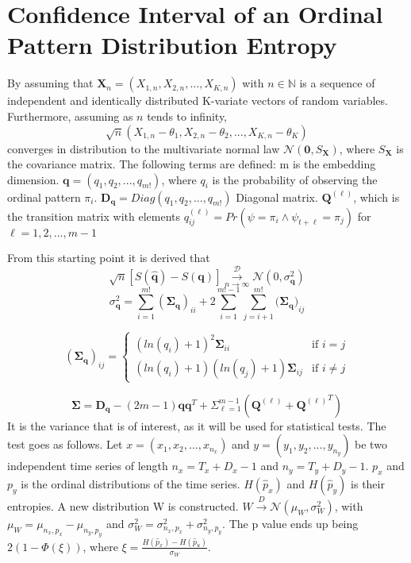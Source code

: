 \section{Confidence Interval of an Ordinal Pattern Distribution Entropy}
By assuming that $\textbf{X}_n = (X_{1,n},X_{2,n},...,X_{K,n})$ with $n \in \mathbb{N}$ is a sequence of independent and identically distributed K-variate vectors of random variables. Furthermore, assuming as $n$ tends to infinity, $$\sqrt{n}(X_{1,n}-\theta_1,X_{2,n}-\theta_2,...,X_{K,n}-\theta_K)$$ 
converges in distribution to the multivariate normal law $\mathscr{N}(\textbf{0},S_{\textbf{X}})$, where $S_{\textbf{X}}$ is the covariance matrix. The following terms are defined:
m is the embedding dimension.
$\mathbf{q}=(q_1,q_2,...,q_{m!})$, where $q_i$ is the probability of observing the ordinal pattern $\pi_i$.
$\mathbf{D_q}=Diag(q_1,q_2,...,q_{m!})$ Diagonal matrix.
$\mathbf{Q}^{(\ell)}$, which is the transition matrix with elements
$q_{ij}^{(\ell)}=Pr(\psi =\pi_i \wedge \psi_{t+\ell}=\pi_j)$
for $\ell = 1,2,...,m-1$


From this starting point it is derived that 
$$\sqrt{n}[S(\hat{\textbf{q}})-S(\textbf{q})] \overset{\mathscr{D}}{\underset{n\rightarrow\infty}{\longrightarrow}}\mathscr{N}(0,\sigma_{\textbf{q}}^2)$$
$$ \sigma_{\textbf{q}}^2=\sum_{i=1}^{m!}(\mathbf{\Sigma_q})_{ii}+2\sum_{i=1}^{m!-1}\sum_{j=i+1}^{m!}(\bm{\Sigma_q)}_{ij}$$

\begin{displaymath}
  (\mathbf{\Sigma_q})_{ij} = \left\{
    \begin{array}{lr}
      (ln(q_i)+1)^2\mathbf{\Sigma}_{ii} & \text{if $i=j$}\\
      (ln(q_i)+1)(ln(q_j)+1)\mathbf{\Sigma}_{ij} & \text{if $i \neq j$}
    \end{array}
  \right.
\end{displaymath} 

$$\mathbf{\Sigma}=\mathbf{D_q}-(2m-1)\mathbf{qq}^T+\Sigma_{\ell=1}^{m-1}(\mathbf{Q}^{(\ell)}+{\mathbf{Q}^{(\ell)}}^T)$$  
\cite{Rey2023}It is the variance that is of interest, as it will be used for statistical tests. The test goes as follows. Let $x=(x_1,x_2,...,x_{n_x})$ and $y=(y_1,y_2,...,y_{n_y})$ be two independent time series of length $n_x=T_x+D_x-1$ and $n_y=T_y+D_y-1$. $p_x$ and $p_y$ is the ordinal distributions of the time series. $H(\hat{p}_x)$ and $H(\hat{p}_y)$ is their entropies. A new distribution W is constructed. $W \overset{D}{\rightarrow}\mathscr{N}(\mu_W,\sigma_W^2)$, with $\mu_W=\mu_{n_x,p_x}-\mu_{n_y,p_y}$ and $\sigma_W^2=\sigma_{n_x,p_x}^2+\sigma_{n_y,p_y}^2$. 
The p value ends up being $2(1-\Phi(\xi))$, where $\xi = \frac{H(\hat{p}_x)-H(\hat{p}_u)}{\sigma_W}$.~\cite{Chagas2022}

